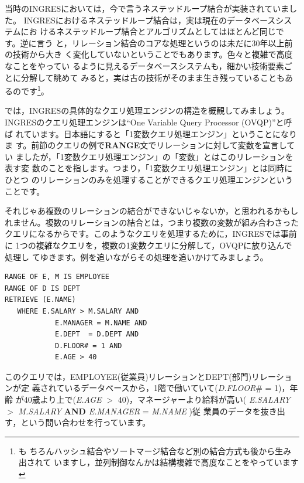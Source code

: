 当時のINGRESにおいては，今で言うネステッドループ結合が実装されていました。
INGRESにおけるネステッドループ結合は，実は現在のデータベースシステムにお
けるネステッドループ結合とアルゴリズムとしてはほとんど同じです。逆に言う
と，リレーション結合のコアな処理というのは未だに30年以上前の技術から大き
く変化していないということでもあります。色々と複雑で高度なことをやってい
るように見えるデータベースシステムも，細かい技術要素ごとに分解して眺めて
みると，実は古の技術がそのまま生き残っていることもあるのです\footnote{も
ちろんハッシュ結合やソートマージ結合など別の結合方式も後から生み出されて
いますし，並列制御なんかは結構複雑で高度なことをやっています}。


では，INGRESの具体的なクエリ処理エンジンの構造を概観してみましょう。
INGRESのクエリ処理エンジンは``One Variable Query Processor (OVQP)''と呼ば
れています。日本語にすると「1変数クエリ処理エンジン」ということになりま
す。前節のクエリの例で{\bf RANGE}文でリレーションに対して変数を宣言してい
ましたが，「1変数クエリ処理エンジン」の「変数」とはこのリレーションを表す変
数のことを指します。つまり，「1変数クエリ処理エンジン」とは同時にひとつ
のリレーションのみを処理することができるクエリ処理エンジンということです。

それじゃあ複数のリレーションの結合ができないじゃないか，と思われるかもし
れません。複数のリレーションの結合とは，つまり複数の変数が組み合わさった
クエリになるからです。このようなクエリを処理するために，INGRESでは事前に
1つの複雑なクエリを，複数の1変数クエリに分解して，OVQPに放り込んで処理し
てゆきます。例を追いながらその処理を追いかけてみましょう。


\begin{center}
 \begin{minipage}{0.8\textwidth}
  \begin{lstlisting}
RANGE OF E, M IS EMPLOYEE
RANGE OF D IS DEPT
RETRIEVE (E.NAME)
   WHERE E.SALARY > M.SALARY AND
            E.MANAGER = M.NAME AND
            E.DEPT  = D.DEPT AND
            D.FLOOR# = 1 AND
            E.AGE > 40
  \end{lstlisting}
 \end{minipage}
\end{center}

このクエリでは，EMPLOYEE(従業員)リレーションとDEPT(部門)リレーションが定
義されているデータベースから，1階で働いていて({\it D.FLOOR}\# = 1)，年齢
が40歳より上で({\it E.AGE} $>$ 40)，マネージャーより給料が高い({\it
E.SALARY} $>$ {\it M.SALARY} {\bf AND} {\it E.MANAGER} = {\it M.NAME} )従
業員のデータを抜き出す，という問い合わせを行っています。

